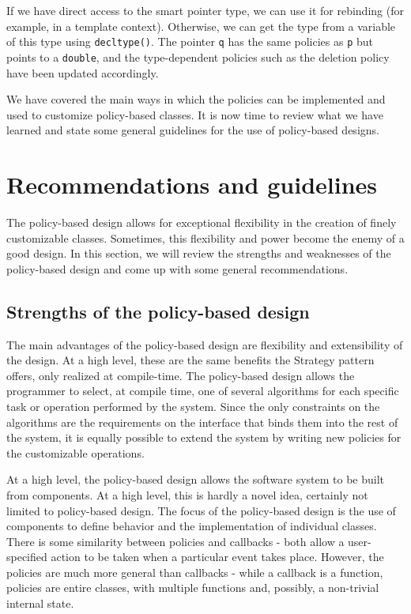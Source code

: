 If we have direct access to the smart pointer type, we can use it for rebinding (for example, in a template context). Otherwise, we can get the type from a variable of this type using \texttt{decltype()}. The pointer \texttt{q} has the same policies as \texttt{p} but points to a \texttt{double}, and the type-dependent policies such as the deletion policy have been updated accordingly.

We have covered the main ways in which the policies can be implemented and used to customize policy-based classes. It is now time to review what we have learned and state some general guidelines for the use of policy-based designs.

\section{Recommendations and guidelines}

The policy-based design allows for exceptional flexibility in the creation of finely customizable classes. Sometimes, this flexibility and power become the enemy of a good design. In this section, we will review the strengths and weaknesses of the policy-based design and come up with some general recommendations.

\subsection{Strengths of the policy-based design}

The main advantages of the policy-based design are flexibility and extensibility of the design. At a high level, these are the same benefits the Strategy pattern offers, only realized at compile-time. The policy-based design allows the programmer to select, at compile time, one of several algorithms for each specific task or operation performed by the system. Since the only constraints on the algorithms are the requirements on the interface that binds them into the rest of the system, it is equally possible to extend the system by writing new policies for the customizable operations.

At a high level, the policy-based design allows the software system to be built from components. At a high level, this is hardly a novel idea, certainly not limited to policy-based design. The focus of the policy-based design is the use of components to define behavior and the implementation of individual classes. There is some similarity between policies and callbacks - both allow a user-specified action to be taken when a particular event takes place. However, the policies are much more general than callbacks - while a callback is a function, policies are entire classes, with multiple functions and, possibly, a non-trivial internal state.

